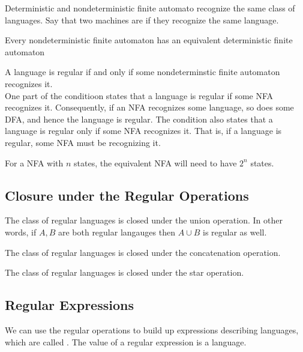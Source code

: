 \documentclass{article}
\begin{document}
Deterministic and nondeterministic finite automato recognize the same class of languages. Say that two machines are  if they recognize the same language. 

\begin{theorem}
  Every nondeterministic finite automaton has an equivalent deterministic finite automaton
\end{theorem}

\begin{lemma}
  A language is regular if and only if some nondeterminstic finite automaton recognizes it. \\ 
  One part of the conditioon states that a language is regular if some NFA recognizes it. Consequently, if an NFA recognizes some language, so does some DFA, and hence the language is regular. The condition also states that a language is regular only if some NFA recognizes it. That is, if a language is regular, some NFA must be recognizing it. 
\end{lemma}

For a NFA with $n$ states, the equivalent NFA will need to have $2^{n}$ states. 

\subsection{Closure under the Regular Operations}

\begin{theorem}
  The class of regular languages is closed under the union operation. In other words, if $A,B$ are both regular langauges then $A \cup B$ is regular as well.  
\end{theorem}

\begin{theorem}
  The class of regular languages is closed under the concatenation operation. 
\end{theorem}

\begin{theorem}
  The class of regular languages is closed under the star operation. 
\end{theorem}

\subsection{Regular Expressions} 

We can use the regular operations to build up expressions describing languages, which are called . The value of a regular expression is a language. 
\end{document}
